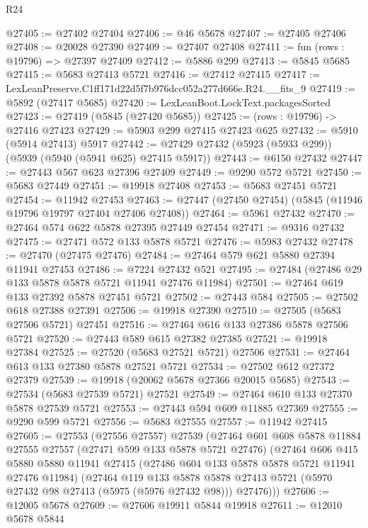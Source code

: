 \begin{lexlean}{R24}
\begin{coremodule}
@27405 := @27402 @27404
@27406 := @46 @5678
@27407 := @27405 @27406
@27408 := @20028 @27390
@27409 := @27407 @27408
@27411 := fun (rows : @19796) => @27397 @27409
@27412 := @5886 @299
@27413 := @5845 @5685
@27415 := @5683 @27413 @5721
@27416 := @27412 @27415
@27417 := LexLeanPreserve.C1ff171d22d5f7b976dcc052a277d666e.R24.__fits_9
@27419 := @5892 (@27417 @5685)
@27420 := LexLeanBoot.LockText.packagesSorted
@27423 := @27419 (@5845 (@27420 @5685))
@27425 := (rows : @19796) -> @27416 @27423
@27429 := @5903 @299 @27415 @27423 @625
@27432 := @5910 (@5914 @27413) @5917
@27442 := @27429 @27432 (@5923 (@5933 @299)) (@5939 (@5940 (@5941 @625) @27415 @5917))
@27443 := @6150 @27432
@27447 := @27443 @567 @623 @27396 @27409
@27449 := @9290 @572 @5721
@27450 := @5683 @27449
@27451 := @19918 @27408
@27453 := @5683 @27451 @5721
@27454 := @11942 @27453
@27463 := @27447 (@27450 @27454) (@5845 (@11946 @19796 @19797 @27404 @27406 @27408))
@27464 := @5961 @27432
@27470 := @27464 @574 @622 @5878 @27395 @27449 @27454
@27471 := @9316 @27432
@27475 := @27471 @572 @133 @5878 @5721
@27476 := @5983 @27432
@27478 := @27470 (@27475 @27476)
@27484 := @27464 @579 @621 @5880 @27394 @11941 @27453
@27486 := @7224 @27432 @521
@27495 := @27484 (@27486 @29 @133 @5878 @5878 @5721 @11941 @27476 @11984)
@27501 := @27464 @619 @133 @27392 @5878 @27451 @5721
@27502 := @27443 @584
@27505 := @27502 @618 @27388 @27391
@27506 := @19918 @27390
@27510 := @27505 (@5683 @27506 @5721) @27451
@27516 := @27464 @616 @133 @27386 @5878 @27506 @5721
@27520 := @27443 @589 @615 @27382 @27385
@27521 := @19918 @27384
@27525 := @27520 (@5683 @27521 @5721) @27506
@27531 := @27464 @613 @133 @27380 @5878 @27521 @5721
@27534 := @27502 @612 @27372 @27379
@27539 := @19918 (@20062 @5678 @27366 @20015 @5685)
@27543 := @27534 (@5683 @27539 @5721) @27521
@27549 := @27464 @610 @133 @27370 @5878 @27539 @5721
@27553 := @27443 @594 @609 @11885 @27369
@27555 := @9290 @599 @5721
@27556 := @5683 @27555
@27557 := @11942 @27415
@27605 := @27553
    (@27556 @27557)
    @27539
    (@27464
      @601
      @608
      @5878
      @11884
      @27555
      @27557
      (@27471 @599 @133 @5878 @5721 @27476)
      (@27464
        @606
        @415
        @5880
        @5880
        @11941
        @27415
        (@27486 @604 @133 @5878 @5878 @5721 @11941 @27476 @11984)
        (@27464
          @119
          @133
          @5878
          @5878
          @27413
          @5721
          (@5970 @27432 @98 @27413 (@5975 (@5976 @27432 @98)))
          @27476)))
@27606 := @12005 @5678
@27609 := @27606 @19911 @5844 @19918
@27611 := @12010 @5678 @5844

\end{coremodule}
\end{lexlean}
